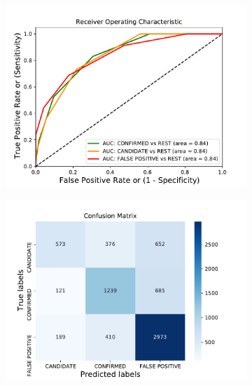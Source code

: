 \begin{figure}[H]
                \centering
                \begin{subfigure}{.49\textwidth}
                \includegraphics[width = 1\textwidth]{data/KNeighborsClassifier_overfit_roc.pdf}
                \end{subfigure}
                \begin{subfigure}{.49\textwidth}
                \includegraphics[width = 1\textwidth]{data/KNeighborsClassifier_overfit_cm.pdf}
                \end{subfigure}
                \begin{subfigure}{.49\textwidth}

\end{subfigure}
\end{figure}
